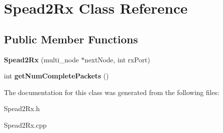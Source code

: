\hypertarget{class_spead2_rx}{}\section{Spead2\+Rx Class Reference}
\label{class_spead2_rx}
\subsection*{Public Member Functions}
\begin{DoxyCompactItemize}
\item 
{\bfseries Spead2\+Rx} (multi\+\_\+node $\ast$next\+Node, int rx\+Port)\hypertarget{class_spead2_rx_af7d85b3ea56a52cb7a41e78cf47572c1}{}\label{class_spead2_rx_af7d85b3ea56a52cb7a41e78cf47572c1}

\item 
int {\bfseries get\+Num\+Complete\+Packets} ()\hypertarget{class_spead2_rx_a8953237adeaacd884bc08cb57df418c5}{}\label{class_spead2_rx_a8953237adeaacd884bc08cb57df418c5}

\end{DoxyCompactItemize}


The documentation for this class was generated from the following files\+:\begin{DoxyCompactItemize}
\item 
Spead2\+Rx.\+h\item 
Spead2\+Rx.\+cpp\end{DoxyCompactItemize}
